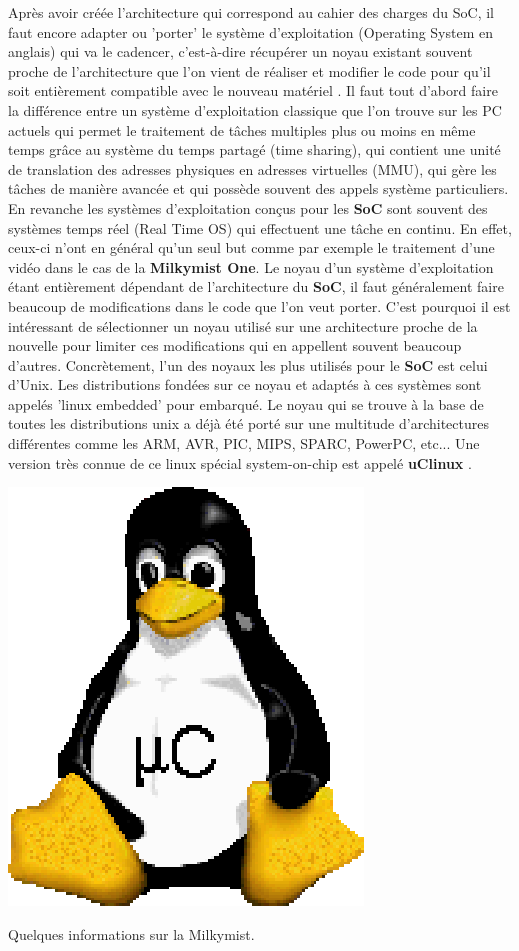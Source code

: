 \vspace{15px}
Après avoir créée l'architecture qui correspond au cahier des charges du SoC,
il faut encore adapter ou 'porter' le système d'exploitation (Operating System
en anglais) qui va le cadencer, c'est-à-dire récupérer un noyau existant
souvent proche de l'architecture que l'on vient de réaliser et modifier le code
pour qu'il soit entièrement compatible avec le nouveau matériel \cite{MILKY_SITE}.  Il faut tout
d'abord faire la différence entre un système d'exploitation classique que l'on
trouve sur les PC actuels qui permet le traitement de tâches multiples plus ou
moins en même temps grâce au système du temps partagé (time sharing), qui
contient une unité de translation des adresses physiques en adresses virtuelles
(MMU), qui gère les tâches de manière avancée et qui possède souvent des appels
système particuliers. En revanche les systèmes d'exploitation conçus pour les
{\bf SoC} sont souvent des systèmes temps réel (Real Time OS) qui effectuent
une tâche en continu. En effet, ceux-ci n'ont en général qu'un seul but comme
par exemple le traitement d'une vidéo dans le cas de la {\bf Milkymist One}.
\medskip Le noyau d'un système d'exploitation étant entièrement dépendant de
l'architecture du {\bf SoC}, il faut généralement faire beaucoup de
modifications dans le code que l'on veut porter. C'est pourquoi il est
intéressant de sélectionner un noyau utilisé sur une architecture proche de la
nouvelle pour limiter ces modifications qui en appellent souvent beaucoup
d'autres.  Concrètement, l'un des noyaux les plus utilisés pour le {\bf SoC}
est celui d'Unix. Les distributions fondées sur ce noyau et adaptés à ces
systèmes sont appelés 'linux embedded' pour embarqué. Le noyau qui se trouve à
la base de toutes les distributions unix a déjà été porté sur une multitude
d'architectures différentes comme les ARM, AVR, PIC, MIPS, SPARC, PowerPC,
etc... Une version très connue de ce linux spécial system-on-chip est appelé
{\bf uClinux} \cite{UCLINUX}.  \medskip

\begin{center} \includegraphics[scale=0.4]{uclinux.eps} \end{center}
\vspace{15px} {\Large Quelques informations sur la Milkymist.}


